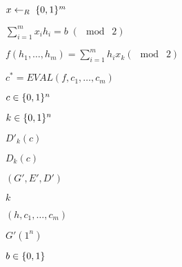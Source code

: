 \documentclass[10pt]{book}
\begin{document}
\begin{mdSnippets}
\begin{mdInlineSnippet}%
$x\leftarrow_R\;\{0,1\}^m$\end{mdInlineSnippet}%
\begin{mdInlineSnippet}%
$\sum_{i=1}^m x_i h_i = b \;(\mod\; 2)$\end{mdInlineSnippet}%
\begin{mdInlineSnippet}[a68b3b1e50462090b4535cfb29c90c65]%
$f(h_1,\ldots,h_m)=\sum_{i=1}^m h_ix_k (\mod\; 2)$\end{mdInlineSnippet}%
\begin{mdInlineSnippet}[751d7b4582e36e3b2ca6e2eda646b38b]%
$c^* = EVAL(f,c_1,\ldots,c_m)$\end{mdInlineSnippet}%
\begin{mdInlineSnippet}[27aab052c1b0a9e69ab5c77f275311e8]%
$c\in\{0,1\}^n$\end{mdInlineSnippet}%
\begin{mdInlineSnippet}[7dd6f3f36f263296e566707d19e7c7aa]%
$k\in\{0,1\}^n$\end{mdInlineSnippet}%
\begin{mdInlineSnippet}%
$D'_k(c)$\end{mdInlineSnippet}%
\begin{mdInlineSnippet}[59aed1076f0596ac84b591e548160db6]%
$D_k(c)$\end{mdInlineSnippet}%
\begin{mdInlineSnippet}[96822b145cbde12fe29d715f95c7849e]%
$(G',E',D')$\end{mdInlineSnippet}%
\begin{mdInlineSnippet}[8ce4b16b22b58894aa86c421e8759df3]%
$k$\end{mdInlineSnippet}%
\begin{mdInlineSnippet}[07480fbe062a699c3f8a9b574d1c0005]%
$(h,c_1,\ldots,c_m)$\end{mdInlineSnippet}%
\begin{mdInlineSnippet}[e19042d5663b539464ba4dfc81324712]%
$G'(1^n)$\end{mdInlineSnippet}%
\begin{mdInlineSnippet}%
$b\in\{0,1\}$\end{mdInlineSnippet}%

\end{mdSnippets}
\end{document}
